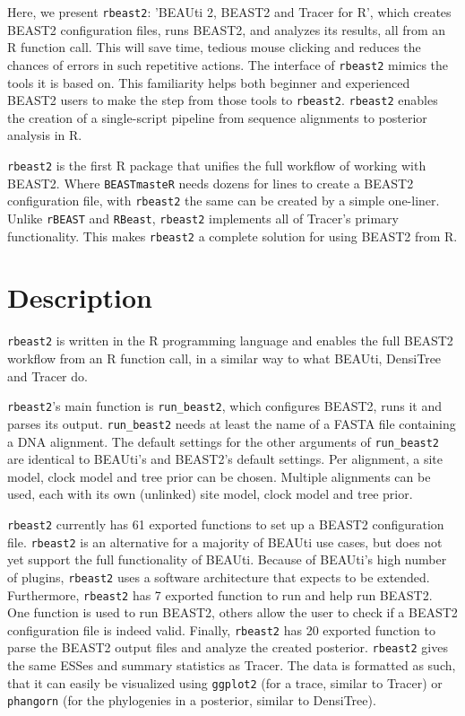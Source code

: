 \documentclass{article}
\begin{document}
Here, we present \verb;rbeast2;:
’BEAUti 2, BEAST2 and Tracer for R’, 
which creates BEAST2 configuration files,
runs BEAST2, and analyzes its results,
all from an R function call. This
will save time, tedious mouse clicking and 
reduces the chances of errors in such repetitive actions.
The interface of \verb;rbeast2; mimics the tools it
is based on. This
familiarity helps both beginner and experienced BEAST2 users 
to make the step from those tools to \verb;rbeast2;.
\verb;rbeast2; enables the creation of a single-script 
pipeline from sequence alignments to posterior analysis in R. 

\verb;rbeast2; is the first R package that unifies the
full workflow of working with BEAST2. 
Where \verb;BEASTmasteR; needs dozens for lines to create
a BEAST2 configuration file, with \verb;rbeast2; the same 
can be created by a simple one-liner. Unlike \verb;rBEAST; 
and \verb;RBeast;, \verb;rbeast2; implements all of Tracer's
primary functionality. This makes \verb;rbeast2; a complete 
solution for using BEAST2 from R.

\section{Description}

\verb;rbeast2; is written in the R programming language \cite{R}
and enables the full BEAST2 workflow from an R function call,
in a similar way to what BEAUti, DensiTree and Tracer do.

\verb;rbeast2;'s main function is \verb;run_beast2;, which
configures BEAST2, runs it and parses its output. 
\verb;run_beast2; needs at least the name of a 
FASTA file containing a DNA alignment. 
The default settings for the other arguments of \verb;run_beast2; 
are identical to BEAUti's and BEAST2's default settings.
Per alignment, a site model, clock model and tree prior can be chosen.
Multiple alignments can be used, each with its own (unlinked) site model, 
clock model and tree prior.

\verb;rbeast2; currently has 61 exported functions to set up  
a BEAST2 configuration file. 
\verb;rbeast2; is an alternative for a majority of BEAUti use cases, 
but does not yet support the full functionality of BEAUti. 
Because of BEAUti's high number of plugins, 
\verb;rbeast2; uses a software architecture that expects to be extended.
Furthermore, \verb;rbeast2; has 7 exported function to run and help run BEAST2.
One function is used to run BEAST2, others
allow the user to check if a BEAST2 configuration file is indeed valid.
Finally, \verb;rbeast2; has 20 exported function to parse the BEAST2 output
files and analyze the created posterior. \verb;rbeast2; gives the
same ESSes and summary statistics as Tracer. The data is formatted
as such, that it can easily be visualized using \verb;ggplot2; (for a trace,
similar to Tracer) or \verb;phangorn; \cite{phangorn} (for 
the phylogenies in a posterior, similar to DensiTree). 
\end{document}

